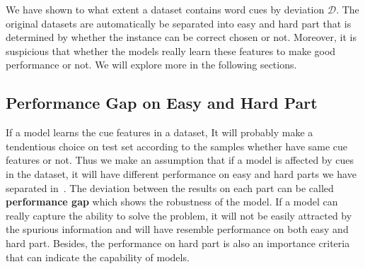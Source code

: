  We have shown to what extent a dataset 
 contains word cues by deviation $\mathcal{D}$. The original datasets are 
 automatically be separated into easy and hard part that is determined by whether the instance 
 can be correct chosen or not.
 Moreover, it is suspicious that whether the models really learn these features 
 to make good performance or not. We will explore more in the following sections.
 
 
\subsection{Performance Gap on Easy and Hard Part}
\label{sec:experiment2}
If a model learns the cue features in a dataset, It 
 will probably make a tendentious choice on 
 test set according to the samples whether have same cue features or not. 
 Thus we make an assumption that if a model is affected by cues 
in the dataset, it will have different performance on easy and hard parts 
we have 
 separated in~.
 The deviation between the results on each part can be called \textbf{performance gap} 
 which shows the robustness of the model. %
 If a model 
 can really capture the ability to solve the problem, it will not be easily attracted by 
 the spurious information and will have resemble performance on both easy and hard 
 part. Besides, the performance on hard part is also an importance criteria that
 can indicate the capability of models.

